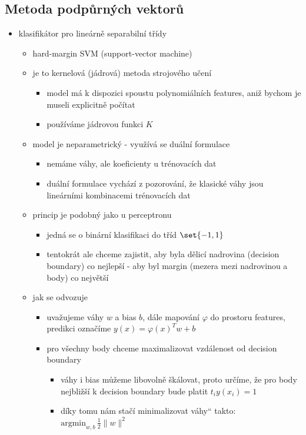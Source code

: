 \subsection{Metoda podpůrných vektorů}
\begin{itemize}
\item klasifikátor pro lineárně separabilní třídy
\begin{itemize}
\item hard-margin SVM (support-vector machine)
\item je to kernelová (jádrová) metoda strojového učení
\begin{itemize}
\item model má k dispozici spoustu polynomiálních features, aniž bychom je museli explicitně počítat
\item používáme jádrovou funkci $K$
\end{itemize}
\item model je neparametrický - využívá se duální formulace
\begin{itemize}
\item nemáme váhy, ale koeficienty u trénovacích dat
\item duální formulace vychází z pozorování, že klasické váhy jsou lineárními kombinacemi trénovacích dat
\end{itemize}
\item princip je podobný jako u perceptronu
\begin{itemize}
\item jedná se o binární klasifikaci do tříd $\set{-1,1}$
\item tentokrát ale chceme zajistit, aby byla dělicí nadrovina (decision boundary) co nejlepší - aby byl margin (mezera mezi nadrovinou a body) co největší
\end{itemize}
\item jak se odvozuje
\begin{itemize}
\item uvažujeme váhy $w$ a bias $b$, dále mapování $\varphi$ do prostoru features, predikci označíme $y(x)=\varphi(x)^Tw+b$
\item pro všechny body chceme maximalizovat vzdálenost od decision boundary
\begin{itemize}
\item váhy i bias můžeme libovolně škálovat, proto určíme, že pro body nejbližší k decision boundary bude platit $t_iy(x_i)=1$
\item díky tomu nám stačí \quotedblbase{}minimalizovat váhy\textquotedblleft{} takto: $\mathrm{argmin}_{w,b}\,\frac12\|w\|^2$

\end{itemize}
\end{itemize}
\end{itemize}
\end{itemize}
